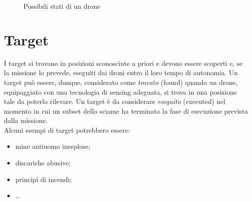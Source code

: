\begin{figure}[H] 
    \captionsetup{justification=centering, margin=2cm, font=footnotesize}
    \begin{center}
    \end{center}
    \caption{Possibili stati di un drone}
    \label{uav_states}
\end{figure}

\section{Target}

I target si trovano in posizioni sconosciute a priori e devono essere scoperti e, se la missione lo prevede, eseguiti dai droni entro il loro tempo di autonomia.
Un target può essere, dunque, considerato come \textit{trovato} (found) quando un drone, equipaggiato con una tecnologia di sensing adeguata, si trova in una posizione tale da poterlo rilevare.
Un target è da considerare \textit{eseguito} (executed) nel momento in cui un subset dello sciame ha terminato la fase di esecuzione prevista dalla missione. \\
Alcuni esempi di target potrebbero essere:

\begin{itemize}
    \item mine antiuomo inesplose;
    \item discariche abusive;
    \item principi di incendi;
    \item \dots
\end{itemize}

